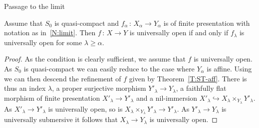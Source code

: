 \documentclass[a4paper,twoside,11pt]{amsart}[2009/07/02] %
\newcommand{\pref}[1]{\eqref{#1}}
\newcommand{\inj}{\hookrightarrow}
\newcommand{\map}[3]{#1\,:\, #2\rightarrow #3}
\begin{document}
\begin{section}{Passage to the limit}
\begin{theorem}
Assume that $S_0$ is quasi-compact and $\map{f_\alpha}{X_\alpha}{Y_\alpha}$ is
of finite presentation with notation as in~\pref{N:limit}. Then $\map{f}{X}{Y}$
is universally open if and only if $f_\lambda$ is universally open for some
$\lambda\geq \alpha$.
\end{theorem}
\begin{proof}
As the condition is clearly sufficient, we assume that $f$ is universally open.
As $S_0$ is quasi-compact we can easily reduce to the case where $Y_\alpha$ is
affine. Using~\cite[Thm.~8.10.5 and Thm.~11.2.6]{egaIV} we can then descend the
refinement of $f$ given by Theorem~\pref{T:ST-aff}. There is thus an index
$\lambda$, a proper surjective morphism $Y'_\lambda\to Y_\lambda$, a faithfully
flat morphism of finite presentation $X'_\lambda\to Y'_\lambda$ and a
nil-immersion $X'_\lambda\inj X_\lambda\times_{Y_\lambda} Y'_\lambda$. As
$X'_\lambda\to Y'_\lambda$ is universally open, so is
$X_\lambda\times_{Y_\lambda} Y'_\lambda\to Y'_\lambda$. As $Y'_\lambda\to
Y_\lambda$ is universally submersive it follows that $X_\lambda\to Y_\lambda$
is universally open.
\end{proof}

\end{section}

\end{document}
